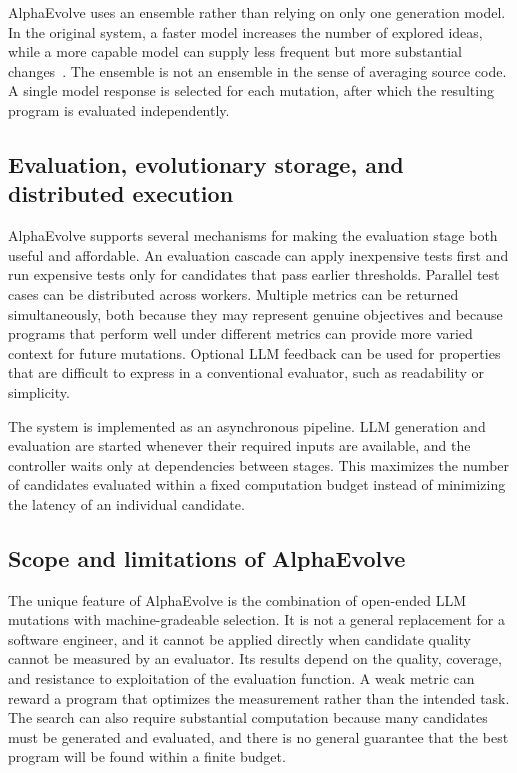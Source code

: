AlphaEvolve uses an ensemble rather than relying on only one generation model.
In the original system, a faster model increases the number of explored ideas,
while a more capable model can supply less frequent but more substantial
changes~\cite{novikov2025alphaevolve}. The ensemble is not an ensemble in the
sense of averaging source code. A single model response is selected for each
mutation, after which the resulting program is evaluated independently.

\subsection{Evaluation, evolutionary storage, and distributed execution}

AlphaEvolve supports several mechanisms for making the evaluation stage both
useful and affordable. An evaluation cascade can apply inexpensive tests first
and run expensive tests only for candidates that pass earlier thresholds.
Parallel test cases can be distributed across workers. Multiple
metrics can be returned simultaneously, both because they may represent genuine
objectives and because programs that perform well under different metrics can
provide more varied context for future mutations. Optional LLM feedback can be
used for properties that are difficult to express in a conventional evaluator,
such as readability or simplicity.

The system is implemented as an asynchronous pipeline. LLM generation and
evaluation are started whenever their required inputs are available, and the
controller waits only at dependencies between stages. This maximizes the
number of candidates evaluated within a fixed computation budget instead of
minimizing the latency of an individual candidate.

\subsection{Scope and limitations of AlphaEvolve}

The unique feature of AlphaEvolve is the combination of open-ended LLM
mutations with machine-gradeable selection. It is not a general replacement
for a software engineer, and it cannot be applied directly when candidate
quality cannot be measured by an evaluator. Its results depend on the quality,
coverage, and resistance to exploitation of the evaluation function. A weak
metric can reward a program that optimizes the measurement rather than the
intended task. The search can also require substantial computation because
many candidates must be generated and evaluated, and there is no general
guarantee that the best program will be found within a finite budget.

